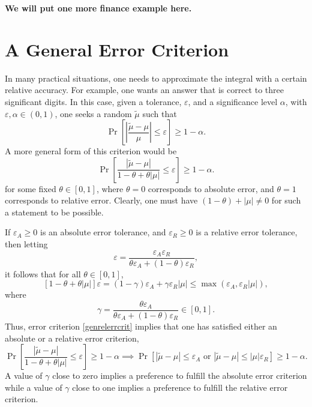 \documentclass[graybox]{svmult}
\newcommand{\Prob}{\Pr}
\newcommand{\abs}[1]{\left|#1\right|}
\newcommand{\tmu}{\tilde{\mu}}
\def\abs#1{\ensuremath{\left \lvert #1 \right \rvert}}
\begin{document}
{\bf We will put one more finance example here.}

\section{A General Error Criterion} \label{relerrsec}

In many practical situations, one needs to approximate the integral with a certain relative accuracy.  For example, one wants an answer that is correct to three significant digits.  In this case, given a tolerance, $\varepsilon$, and a significance level $\alpha$, with $\varepsilon, \alpha \in (0, 1)$, one seeks a random $\tmu$ such that 
\begin{equation*} \label{relerrcrit}
\Prob\left[\abs{\frac{\tmu-\mu}{\mu}} \le \varepsilon \right] \geq 1-\alpha.
\end{equation*}
A more general form of this criterion would be
\begin{equation} \label{genrelerrcrit}
\Prob\left[\frac{\abs{\tmu-\mu}} {1-\theta + \theta\abs{\mu}} \le \varepsilon \right] \geq 1-\alpha.
\end{equation}
for some fixed $\theta \in [0,1]$, where $\theta=0$ corresponds to absolute error, and $\theta = 1$ corresponds to relative error.  Clearly, one must have $(1-\theta) + \abs{\mu}\ne0$ for such a statement to be possible.  

If $\varepsilon_{A} \ge 0$ is an absolute error tolerance, and $\varepsilon_{R} \ge 0$ is a relative error tolerance, then letting 
\[
\varepsilon = \frac{\varepsilon_{A}\varepsilon_{R}}{\theta \varepsilon_{A} + (1-\theta) \varepsilon_{R}},
\]
it follows that for all $\theta \in [0,1]$,
\[
[1-\theta + \theta \abs{\mu}]\varepsilon = (1-\gamma)\varepsilon_{A} + \gamma \varepsilon_{R} \abs{\mu} \le \max(\varepsilon_{A},\varepsilon_{R} \abs{\mu}),
\]
where
\[
\gamma = \frac{\theta \varepsilon_{A}}{\theta \varepsilon_{A} + (1-\theta) \varepsilon_{R}} \in [0,1].
\]
Thus, error criterion  \eqref{genrelerrcrit} implies that one has satisfied either an absolute or a relative error criterion, 
\[
\Prob\left[\frac{\abs{\tmu-\mu}} {1-\theta + \theta\abs{\mu}} \le \varepsilon \right] \geq 1-\alpha \implies \Prob\left[\abs{\tmu-\mu} \le \varepsilon_A \text{ or } \abs{\tmu-\mu} \le \abs{\mu}\varepsilon_R \right] \geq 1-\alpha.
\]
A value of $\gamma$ close to zero implies a preference to fulfill the absolute error criterion while a value of $\gamma$ close to one implies a preference to fulfill the relative error criterion.
\end{document}
